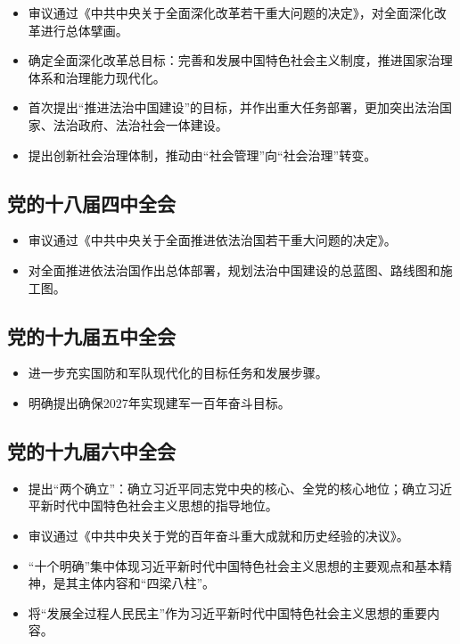 \documentclass[12pt,a4paper]{ctexart}
\begin{document}
\begin{itemize}
\item 审议通过《中共中央关于全面深化改革若干重大问题的决定》，对全面深化改革进行总体擘画。
\item 确定全面深化改革总目标：完善和发展中国特色社会主义制度，推进国家治理体系和治理能力现代化。
\item 首次提出“推进法治中国建设”的目标，并作出重大任务部署，更加突出法治国家、法治政府、法治社会一体建设。
\item 提出创新社会治理体制，推动由“社会管理”向“社会治理”转变。
\end{itemize}

\subsection*{党的十八届四中全会}

\begin{itemize}
\item 审议通过《中共中央关于全面推进依法治国若干重大问题的决定》。
\item 对全面推进依法治国作出总体部署，规划法治中国建设的总蓝图、路线图和施工图。
\end{itemize}

\subsection*{党的十九届五中全会}

\begin{itemize}
\item 进一步充实国防和军队现代化的目标任务和发展步骤。
\item 明确提出确保2027年实现建军一百年奋斗目标。
\end{itemize}

\subsection*{党的十九届六中全会}

\begin{itemize}
\item 提出“两个确立”：确立习近平同志党中央的核心、全党的核心地位；确立习近平新时代中国特色社会主义思想的指导地位。
\item 审议通过《中共中央关于党的百年奋斗重大成就和历史经验的决议》。
\item “十个明确”集中体现习近平新时代中国特色社会主义思想的主要观点和基本精神，是其主体内容和“四梁八柱”。
\item 将“发展全过程人民民主”作为习近平新时代中国特色社会主义思想的重要内容。
\end{itemize}
\end{document}
